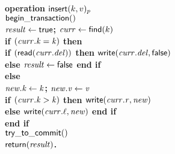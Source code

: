 \begin{figure}[h!]
{{\begin{minipage}[t]{150mm}
\begin{tabbing}
   		
\bf{operation} $\act{insert}(k,v)_p$ \\
		 \> $\lit{begin\_transaction}()$ \\
		 \> $\ms{result} \gets \lit{true}$; $\ms{curr} \gets \lit{find}(k)$  \\%
		 \> \bf{if} $(\ms{curr.k} = \ms{k})$ \bf{then} \\
		 \>\>\> \bf{if} $(\lit{read}(\ms{curr.del}))$ \bf{then} $\lit{write}(\ms{curr.del}, \lit{false})$ \\%
						
		 \>\>\>\> \bf{else} $\ms{result} \gets \lit{false}$ \bf{end if} \\%
		 \>\> \bf{else}  \\%
		 \>\>\> $\ms{new.k} \gets \ms{k}$; $\ms{new.v} \gets \ms{v}$ \\
		 \>\>\> \bf{if} $(\ms{curr.k} > \ms{k})$ \bf{then} $\lit{write}(\ms{curr.r},\ms{new})$ \\%
		 \>\>\>\> \bf{else} $\lit{write}(\ms{curr.\ell}, \ms{new})$ \bf{end if} \\%
		 \> \bf{end if} \\
		 \> $\lit{try\_to\_commit}()$ \\
		 \> $\sf{return}(\ms{result})$. \\%
   		

\end{tabbing}
\end{minipage}}}
\end{figure}
